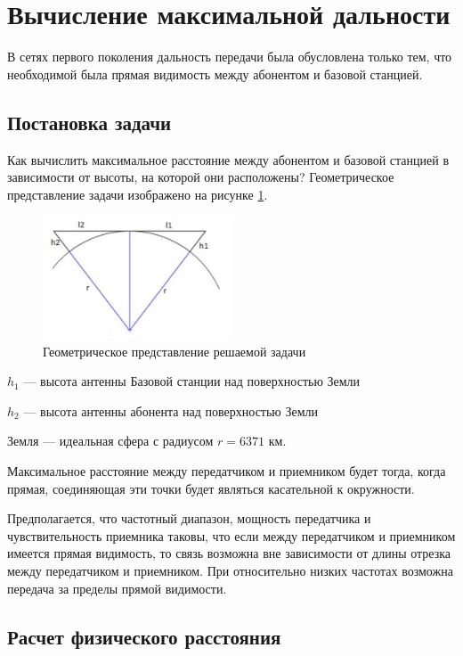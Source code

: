 \section{Вычисление максимальной дальности}
В сетях первого поколения дальность передачи была обусловлена только
тем, что необходимой была прямая видимость между абонентом
и базовой станцией.
\subsection{Постановка задачи}
Как вычислить максимальное расстояние между абонентом и базовой станцией в зависимости от высоты, на которой они расположены? Геометрическое представление задачи изображено на рисунке \ref{fig:img8}.

\begin{figure}[H]
	\centering
	\includegraphics[width=0.5\textwidth]{img/kich_bur/image8}
	\caption{Геометрическое представление решаемой задачи}
	\label{fig:img8}
\end{figure}

$ h_1 $ --- высота антенны Базовой станции над поверхностью Земли 

$ h_2 $ --- высота антенны абонента над поверхностью Земли 

Земля --- идеальная сфера с радиусом $r = 6371$ км.

Максимальное расстояние между передатчиком и приемником будет тогда, когда прямая, соединяющая эти точки будет являться касательной к окружности. 

Предполагается, что частотный диапазон, мощность передатчика и чувствительность
приемника таковы, что если между передатчиком и приемником имеется
прямая видимость, то связь возможна вне зависимости от длины отрезка
между передатчиком и приемником. При относительно низких частотах
возможна передача за пределы прямой видимости. 

\subsection{Расчет физического расстояния}

